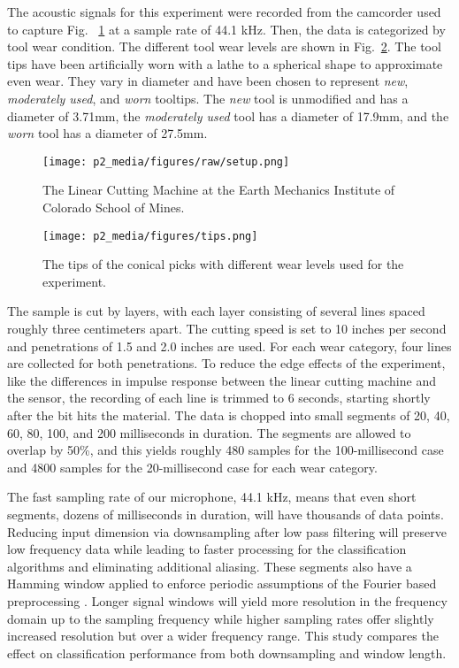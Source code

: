 The acoustic signals for this experiment were recorded from the camcorder 
used to capture Fig. ~\ref{fig:setup} at a sample rate of 44.1 kHz.
Then, the data is categorized by tool wear condition.
The different tool wear levels are shown in Fig.~\ref{fig:levels}.
The tool tips have been artificially worn with a lathe to a spherical shape to approximate even wear.
They vary in diameter and have been chosen to represent 
\textit{new}, \textit{moderately used}, and \textit{worn} tooltips.
The \textit{new} tool is unmodified and has a diameter of 3.71mm, 
the \textit{moderately used} tool has a diameter of 17.9mm,
 and the \textit{worn} tool has a diameter of 27.5mm.

\begin{figure}[t!]
\centering
\texttt{[image: p2\_media/figures/raw/setup.png]}
\caption{The Linear Cutting Machine at the Earth Mechanics Institute of Colorado School of Mines.
}
\label{fig:setup}
\end{figure}

\begin{figure}[t!]
\centering
\texttt{[image: p2\_media/figures/tips.png]}
\caption{The tips of the conical picks with different wear levels used for the experiment.
}
\label{fig:levels}
\end{figure}

The sample is cut by layers, with each layer consisting of several lines spaced roughly three centimeters apart. 
The cutting speed is set to 10 inches per second and penetrations of 1.5 and 2.0 inches are used. 
For each wear category, four lines are collected for both penetrations. 
To reduce the edge effects of the experiment, like the differences in impulse response between 
the linear cutting machine and the sensor, the recording of each line is trimmed to 6 seconds, 
starting shortly after the bit hits the material. The data is chopped into small segments of 
20, 40, 60, 80, 100, and 200 milliseconds in duration. The segments are allowed to overlap by 50\%, 
and this yields roughly 480 samples for the 100-millisecond case and 4800 samples for the 
20-millisecond case for each wear category.

The fast sampling rate of our microphone, 44.1 kHz, means that even short segments,
dozens of milliseconds in duration, will have thousands of data points.
Reducing input dimension via downsampling after low pass filtering will preserve 
low frequency data while leading to faster processing for the classification algorithms and 
eliminating additional aliasing.
These segments also have a Hamming window applied 
to enforce periodic assumptions of the Fourier based preprocessing \cite{prabhu2014window}.
Longer signal windows will yield more resolution in the frequency domain up to the sampling frequency
while higher sampling rates offer slightly increased resolution but over a wider frequency range.
This study compares the effect on classification performance from both downsampling and window length.

